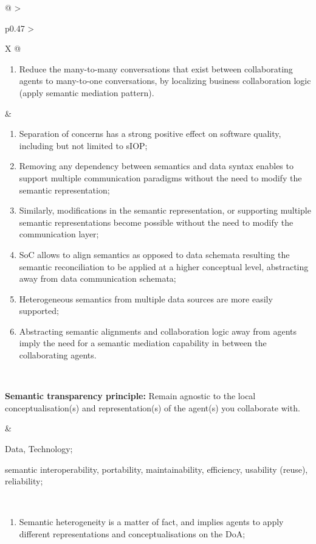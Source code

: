 \begin{xltabular}[l]{\linewidth}{@{} >{\small\raggedright\arraybackslash}p{0.47\linewidth} >{\small\raggedright\arraybackslash}X @{}}
\begin{enumerate}[left=6pt, nosep]
  \item Reduce the many-to-many conversations that exist between collaborating agents to many-to-one conversations, by localizing business collaboration logic (apply semantic mediation pattern).
\end{enumerate}
&
\begin{enumerate}[left=10pt, nosep]
  \item Separation of concerns has a strong positive effect on software quality, including but not limited to sIOP;
  \item Removing any dependency between semantics and data syntax enables to support multiple communication paradigms without the need to modify the semantic representation;
  \item Similarly, modifications in the semantic representation, or supporting multiple semantic representations become possible without the need to modify the communication layer;
  \item SoC allows to align semantics as opposed to data schemata resulting the semantic reconciliation to be applied at a higher conceptual level, abstracting away from data communication schemata;
  \item Heterogeneous semantics from multiple data sources are more easily supported;
  \item Abstracting semantic alignments and collaboration logic away from agents imply the need for a semantic mediation capability in between the collaborating agents.
\end{enumerate} \\
%
%
%
\begin{mmdp}\label{dp:st}{\bfseries Semantic transparency principle:}
\quad Remain agnostic to the local conceptualisation(s) and representation(s) of the agent(s) you collaborate with. \end{mmdp}
&
\begin{description}[labelwidth=3.7cm,leftmargin=3.7cm+1ex,nosep,topsep=2ex,labelsep=1ex,font=\bfseries]
\item[Type of information:] Data, Technology;
\item[Quality attributes:] semantic interoperability, portability, maintainability, efficiency, usability (reuse), reliability;
\end{description}
\\
\begin{enumerate}[left=6pt, nosep]
  \item Semantic heterogeneity is a matter of fact, and implies agents to apply different representations and conceptualisations on the DoA;

\end{enumerate}
\end{xltabular}
